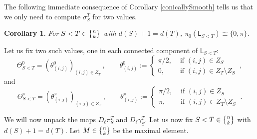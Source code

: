 \documentclass{article}
\newcommand{\msf}[1]{\mathsf{#1}}
\newcommand{\bl}{\msf{Bl}}
\newcommand{\gr}{\msf{Gr}}
\newcommand{\nchoosek}{\textstyle\genfrac{\lbrace}{\rbrace}{0pt}{}}
\newtheorem{proposition}[theorem]{Proposition}
\newtheorem{corollary}[theorem]{Corollary}
\theoremstyle{definition}
\begin{document}


The following immediate consequence of Corollary \ref{conicallySmooth} tells us that we only need to compute 
$\sigma^T_S$ for two values.

\begin{corollary}\label{piNaughtLink}
    For $S<T \in \nchoosek{n}{k}$ with $d(S)+1=d(T)$, $\pi_0(\msf{L}_{S<T}) \cong \{0, \pi\}$.
\end{corollary}

Let us fix two such values, one in each connected component of $\msf{L}_{S<T}$:
$$\Theta_{S<T}^0 = (\theta^0_{(i,j)})_{(i,j)\in Z_T}~, \qquad \theta^0_{(i,j)} := 
    \begin{cases} \pi/2, &\text{ if } (i,j) \in Z_S \\ 0, &\text{ if } (i,j) \in Z_T\setminus Z_S\end{cases}~,$$
and 
$$\Theta_{S<T}^\pi = (\theta^\pi_{(i,j)})_{(i,j)\in Z_T}~, \qquad \theta^\pi_{(i,j)} := 
    \begin{cases} \pi/2, &\text{ if } (i,j) \in Z_S \\ \pi, &\text{ if } (i,j) \in Z_T\setminus Z_S \end{cases}~.$$

We will now unpack the maps $D_\ell \pi_S^T$ and $D_\ell\gamma_S^T$. Let us now fix $S<T \in \nchoosek{n}{k}$
with $d(S)+1=d(T)$.
Let $M \in \nchoosek{n}{k}$ be the
maximal element. \\
\end{document}
